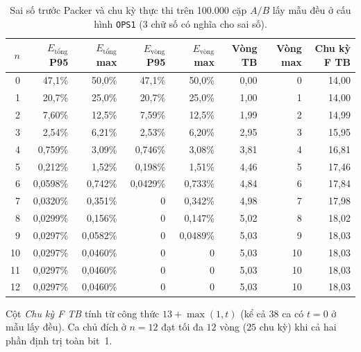 \begin{table}[htbp]
  \centering
  \footnotesize
  \setlength{\tabcolsep}{4pt}
  \caption{Sai số trước Packer và chu kỳ thực thi trên 100.000 cặp $A/B$ lấy mẫu đều ở cấu hình \texttt{OPS1} (3 chữ số có nghĩa cho sai số).}
  \label{tab:prepack}
  \begin{tabular}{rrrrrrrr}
    \toprule
    $n$ & $E_{\text{tổng}}$ P95 & $E_{\text{tổng}}$ max &
    $E_{\text{vòng}}$ P95 & $E_{\text{vòng}}$ max & Vòng TB & Vòng max & Chu kỳ F TB \\
    \midrule
    0  & 47,1\% & 50,0\% & 47,1\% & 50,0\% & 0,00 & 0  & 14,00 \\
    1  & 20,7\% & 25,0\% & 20,7\% & 25,0\% & 1,00 & 1  & 14,00 \\
    2  & 7,60\% & 12,5\% & 7,59\% & 12,5\% & 1,99 & 2  & 14,99 \\
    3  & 2,54\% & 6,21\% & 2,53\% & 6,20\% & 2,95 & 3  & 15,95 \\
    4  & 0,759\% & 3,09\% & 0,746\% & 3,08\% & 3,81 & 4  & 16,81 \\
    5  & 0,212\% & 1,52\% & 0,198\% & 1,51\% & 4,46 & 5  & 17,46 \\
    6  & 0,0598\% & 0,742\% & 0,0429\% & 0,733\% & 4,84 & 6  & 17,84 \\
    7  & 0,0320\% & 0,351\% & 0 & 0,342\% & 4,98 & 7  & 17,98 \\
    8  & 0,0299\% & 0,156\% & 0 & 0,147\% & 5,02 & 8  & 18,02 \\
    9  & 0,0297\% & 0,0582\% & 0 & 0,0489\% & 5,03 & 9  & 18,03 \\
    10 & 0,0297\% & 0,0460\% & 0 & 0 & 5,03 & 10 & 18,03 \\
    11 & 0,0297\% & 0,0460\% & 0 & 0 & 5,03 & 10 & 18,03 \\
    12 & 0,0297\% & 0,0460\% & 0 & 0 & 5,03 & 10 & 18,03 \\
    \bottomrule
  \end{tabular}
  \par\smallskip
  \footnotesize Cột \textit{Chu kỳ F TB} tính từ công thức $13+\max(1,t)$ (kể cả $38$ ca có $t=0$ ở mẫu lấy đều). Ca chủ đích ở $n=12$ đạt tối đa $12$ vòng ($25$ chu kỳ) khi cả hai phần định trị toàn bit~1.
\end{table}
